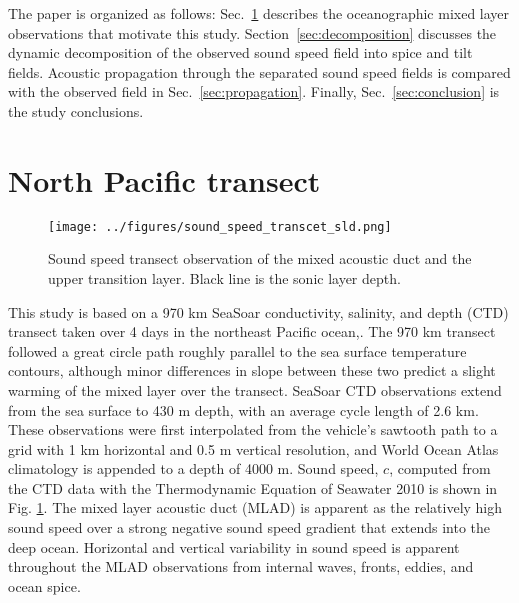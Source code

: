 \documentclass[preprint,NumberedRefs]{JASA}
\begin{document}
The paper is organized as follows: Sec.~\ref{sec:transcet} describes the oceanographic mixed layer observations that motivate this study. Section~\ref{sec:decomposition} discusses the dynamic decomposition of the observed sound speed field into spice and tilt fields. Acoustic propagation through the separated sound speed fields is compared with the observed field in Sec.~\ref{sec:propagation}. Finally, Sec.~\ref{sec:conclusion} is the study conclusions.

\section{North Pacific transect}\label{sec:transcet}
\begin{figure}
\texttt{[image: ../figures/sound\_speed\_transcet\_sld.png]}
\caption{\label{fig:c_grid}{Sound speed transect observation of the mixed acoustic duct and the upper transition layer. Black line is the sonic layer depth.}}
\end{figure}

This study is based on a 970 km SeaSoar conductivity, salinity, and depth (CTD) transect taken over 4 days in the northeast Pacific ocean,\citep{cole2010seasonal}. The 970 km transect followed a great circle path roughly parallel to the sea surface temperature contours, although minor differences in slope between these two predict a slight warming of the mixed layer over the transect. SeaSoar CTD observations extend from the sea surface to 430 m depth, with an average cycle length of 2.6 km. These observations were first interpolated from the vehicle's sawtooth path to a grid with 1 km horizontal and 0.5 m vertical resolution\citep{colosi2020observations}, and World Ocean Atlas climatology is appended to a depth of 4000 m\citep{WOA}. Sound speed, $c$, computed from the CTD data with the Thermodynamic Equation of Seawater 2010\cite{TEOS10} is shown in Fig. \ref{fig:c_grid}. The mixed layer acoustic duct (MLAD) is apparent as the relatively high sound speed over a strong negative sound speed gradient that extends into the deep ocean. Horizontal and vertical variability in sound speed is apparent throughout the MLAD observations from internal waves, fronts, eddies, and ocean spice\citep{colosi2020observations}.
\end{document}
